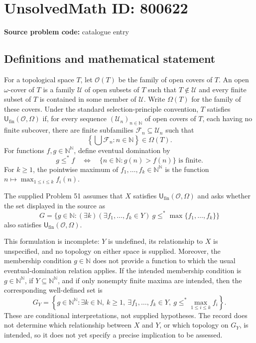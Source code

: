\documentclass[11pt]{article}
\begin{document}
\section*{UnsolvedMath ID: 800622}
\textbf{Source problem code:} catalogue entry
\subsection{Definitions and mathematical statement}
For a topological space \(T\), let \(\mathcal O(T)\) be the family of open covers of \(T\). An open \(\omega\)-cover of \(T\) is a family \(\mathcal U\) of open subsets of \(T\) such that \(T\notin\mathcal U\) and every finite subset of \(T\) is contained in some member of \(\mathcal U\). Write \(\Omega(T)\) for the family of these covers. Under the standard selection-principle convention, \(T\) satisfies \(\mathsf U_{\mathrm{fin}}(\mathcal O,\Omega)\) if, for every sequence \((\mathcal U_n)_{n\in\mathbb N}\) of open covers of \(T\), each having no finite subcover, there are finite subfamilies \(\mathcal F_n\subseteq\mathcal U_n\) such that
\[
\left\{\bigcup\mathcal F_n:n\in\mathbb N\right\}\in\Omega(T).
\]
For functions \(f,g\in\mathbb N^{\mathbb N}\), define eventual domination by
\[
g\leq^* f\quad\Longleftrightarrow\quad
\{n\in\mathbb N:g(n)>f(n)\}\text{ is finite}.
\]
For \(k\geq1\), the pointwise maximum of \(f_1,\ldots,f_k\in\mathbb N^{\mathbb N}\) is the function \(n\mapsto\max_{1\leq i\leq k}f_i(n)\).

The supplied Problem 51 assumes that \(X\) satisfies \(\mathsf U_{\mathrm{fin}}(\mathcal O,\Omega)\) and asks whether the set displayed in the source as
\[
G=\{g\in\mathbb N:(\exists k)(\exists f_1,\ldots,f_k\in Y)\ g\leq^*\max\{f_1,\ldots,f_k\}\}
\]
also satisfies \(\mathsf U_{\mathrm{fin}}(\mathcal O,\Omega)\).

This formulation is incomplete: \(Y\) is undefined, its relationship to \(X\) is unspecified, and no topology on either space is supplied. Moreover, the membership condition \(g\in\mathbb N\) does not provide a function to which the usual eventual-domination relation applies. If the intended membership condition is \(g\in\mathbb N^{\mathbb N}\), if \(Y\subseteq\mathbb N^{\mathbb N}\), and if only nonempty finite maxima are intended, then the corresponding well-defined set is
\[
G_Y=\left\{g\in\mathbb N^{\mathbb N}:\exists k\in\mathbb N,\ k\geq1,\ \exists f_1,\ldots,f_k\in Y,\ g\leq^*\max_{1\leq i\leq k}f_i\right\}.
\]
These are conditional interpretations, not supplied hypotheses. The record does not determine which relationship between \(X\) and \(Y\), or which topology on \(G_Y\), is intended, so it does not yet specify a precise implication to be assessed.
\end{document}
